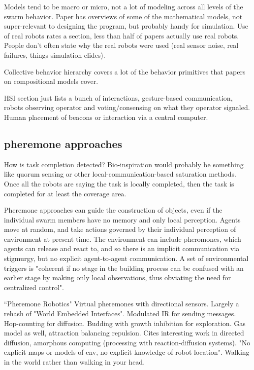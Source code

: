 \documentclass[]{article}
\begin{document}
Models tend to be macro or micro, not a lot of modeling across all levels of the swarm behavior. Paper has overviews of some of the mathematical models, not super-relevant to designing the program, but probably handy for simulation. Use of real robots rates a section, less than half of papers actually use real robots. People don't often state why the real robots were used (real sensor noise, real failures, things simulation elides). 

Collective behavior hierarchy covers a lot of the behavior primitives that papers on compositional models cover. 

HSI section just lists a bunch of interactions, gesture-based communication, robots observing operator and voting/consensing on what they operator signaled. Human placement of beacons or interaction via a central computer.

\subsection{pheremone approaches}

How is task completion detected? Bio-inspiration would probably be something like quorum sensing or other local-communication-based saturation methods. Once all the robots are saying the task is locally completed, then the task is completed for at least the coverage area. 

Pheremone approaches can guide the construction of objects, even if the individual swarm members have no memory and only local perception\cite{mason2003programming}. 
Agents move at random, and take actions governed by their individual perception of environment at present time. 
The environment can include pheromones, which agents can release and react to, and so there is an implicit communication via stigmurgy, but no explicit agent-to-agent communication. 
A set of environmental triggers is "coherent if no stage in the building process can be confused with an earlier stage by making only local observations, thus obviating the need for centralized control".   

``Pheremone Robotics" \cite{payton2001pheromone} Virtual pheremones with directional sensors. Largely a rehash of "World Embedded Interfaces". Modulated IR for sending messages. Hop-counting for diffusion. Budding with growth inhibition for exploration. Gas model as well, attraction balancing repulsion. Cites interesting work in directed diffusion, amorphous computing (processing with reaction-diffusion systems). "No explicit maps or models of env, no explicit knowledge of robot location". Walking in the world rather than walking in your head. 
\end{document}
